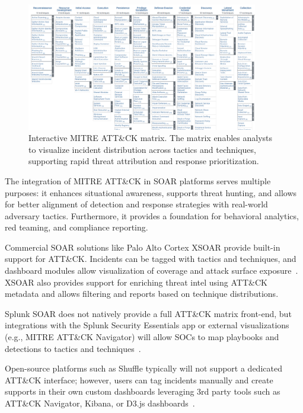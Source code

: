 \begin{figure}[ht]
    \centering
    \includegraphics[width=0.9\textwidth]{images/mitre_att&ck_matrix.png}
    \caption[Interactive MITRE ATT\&CK matrix]{Interactive MITRE ATT\&CK matrix. The matrix enables analysts to visualize incident distribution across tactics and techniques, supporting rapid threat attribution and response prioritization.}
    \label{fig:mitre-attck-matrix}
\end{figure}

The integration of MITRE ATT\&CK in SOAR platforms serves multiple purposes: it enhances situational awareness, supports threat hunting, and allows for better alignment of detection and response strategies with real-world adversary tactics. Furthermore, it provides a foundation for behavioral analytics, red teaming, and compliance reporting.

Commercial SOAR solutions like Palo Alto Cortex XSOAR provide built-in support for ATT\&CK. Incidents can be tagged with tactics and techniques, and dashboard modules allow visualization of coverage and attack surface exposure~\cite{paloalto}. XSOAR also provides support for enriching threat intel using ATT\&CK metadata and allows filtering and reports based on technique distributions.

Splunk SOAR does not natively provide a full ATT\&CK matrix front-end, but integrations with the Splunk Security Essentials app or external visualizations (e.g., MITRE ATT\&CK Navigator) will allow SOCs to map playbooks and detections to tactics and techniques~\cite{splunk}.

Open-source platforms such as Shuffle typically will not support a dedicated ATT\&CK interface; however, users can tag incidents manually and create supports in their own custom dashboards leveraging 3rd party tools such as ATT\&CK Navigator, Kibana, or D3.js dashboards~\cite{techtarget}.

